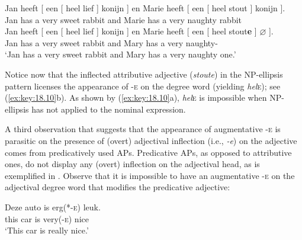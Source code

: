\documentclass[output=paper]{langsci/langscibook}
\begin{document}
\ea%
    \label{ex:key:18.9}
	\ea
	\gll Jan   heeft  [ een  [ heel  lief ] konijn ] en  Marie  heeft  [ een  [ heel  stout ]      konijn ].\\
    Jan    has    {}  a  {}  very    sweet {} rabbit {} and  Marie  has  {} a  {}  very    naughty {}    rabbit\\
	\glt
	\ex
	\gll Jan    heeft  [ een  [ heel  lief ]      konijn ] en  Marie  heeft  [ een  [ heel    stout\textbf{e} ] $\varnothing$ ].\\
    Jan    has  {}  a    {}  very    sweet {} rabbit  {}  and  Mary  has    {}
    a   {}   very    naughty-\Agr{}\\
	\glt \enquote*{Jan has a very sweet rabbit and Mary has a very naughty one.}
	\z
\z

Notice now that the inflected attributive adjective (\emph{stoute}) in the
NP-ellipsis pattern licenses the appearance of \textsc{-e} on the degree word
(yielding \emph{hel}\textsc{e}); see (\ref{ex:key:18.10}b). As shown by
(\ref{ex:key:18.10}a), \emph{hel}\textsc{e} is impossible when NP-ellipsis has not
applied to the nominal expression.

\ea%
\label{ex:key:18.10}
	\z
\z

A third observation that suggests that the appearance of augmentative
\textsc{-e} is parasitic on the presence of (overt) adjectival inflection
(i.e., \emph{-e}) on the adjective comes from predicatively used APs.
Predicative APs, as opposed to attributive ones, do not display any (overt)
inflection on the adjectival head, as is exemplified in .
Observe that it is impossible to have an augmentative \textsc{-e} on the
adjectival degree word that modifies the predicative adjective:

\ea%
\label{ex:key:18.11}
    \sn
    \gll Deze    auto    is  erg(*-\textsc{e})    leuk.\\
        this      car      is  very(\textsc{-e})  nice\\
    \glt \enquote*{This car is really nice.}
\z
\end{document}
